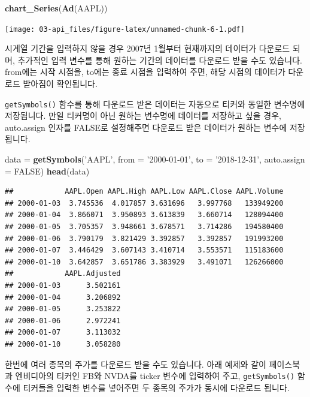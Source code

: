 \documentclass[]{book}
\newenvironment{Shaded}{\begin{snugshade}}{\end{snugshade}}
\newcommand{\DataTypeTok}[1]{\textcolor[rgb]{0.13,0.29,0.53}{#1}}
\newcommand{\KeywordTok}[1]{\textcolor[rgb]{0.13,0.29,0.53}{\textbf{#1}}}
\newcommand{\NormalTok}[1]{#1}
\newcommand{\OtherTok}[1]{\textcolor[rgb]{0.56,0.35,0.01}{#1}}
\newcommand{\StringTok}[1]{\textcolor[rgb]{0.31,0.60,0.02}{#1}}
\begin{document}
\begin{Shaded}
\begin{Highlighting}[]
\KeywordTok{chart_Series}\NormalTok{(}\KeywordTok{Ad}\NormalTok{(AAPL))}
\end{Highlighting}
\end{Shaded}

\texttt{[image: 03-api\_files/figure-latex/unnamed-chunk-6-1.pdf]}

시계열 기간을 입력하지 않을 경우 2007년 1월부터 현재까지의 데이터가 다운로드 되며, 추가적인 입력 변수를 통해 원하는 기간의 데이터를 다운로드 받을 수도 있습니다. from에는 시작 시점을, to에는 종료 시점을 입력하여 주면, 해당 시점의 데이터가 다운로드 받아짐이 확인됩니다.

\texttt{getSymbols()} 함수를 통해 다운로드 받은 데이터는 자동으로 티커와 동일한 변수명에 저장됩니다. 만일 티커명이 아닌 원하는 변수명에 데이터를 저장하고 싶을 경우, auto.assign 인자를 FALSE로 설정해주면 다운로드 받은 데이터가 원하는 변수에 저장됩니다.

\begin{Shaded}
\begin{Highlighting}[]
\NormalTok{data =}\StringTok{ }\KeywordTok{getSymbols}\NormalTok{(}\StringTok{'AAPL'}\NormalTok{, }\DataTypeTok{from =} \StringTok{'2000-01-01'}\NormalTok{, }\DataTypeTok{to =} \StringTok{'2018-12-31'}\NormalTok{, }\DataTypeTok{auto.assign =} \OtherTok{FALSE}\NormalTok{)}
\KeywordTok{head}\NormalTok{(data)}
\end{Highlighting}
\end{Shaded}

\begin{verbatim}
##            AAPL.Open AAPL.High AAPL.Low AAPL.Close AAPL.Volume
## 2000-01-03  3.745536  4.017857 3.631696   3.997768   133949200
## 2000-01-04  3.866071  3.950893 3.613839   3.660714   128094400
## 2000-01-05  3.705357  3.948661 3.678571   3.714286   194580400
## 2000-01-06  3.790179  3.821429 3.392857   3.392857   191993200
## 2000-01-07  3.446429  3.607143 3.410714   3.553571   115183600
## 2000-01-10  3.642857  3.651786 3.383929   3.491071   126266000
##            AAPL.Adjusted
## 2000-01-03      3.502161
## 2000-01-04      3.206892
## 2000-01-05      3.253822
## 2000-01-06      2.972241
## 2000-01-07      3.113032
## 2000-01-10      3.058280
\end{verbatim}

한번에 여러 종목의 주가를 다운로드 받을 수도 있습니다. 아래 예제와 같이 페이스북과 엔비디아의 티커인 FB와 NVDA를 ticker 변수에 입력하여 주고, \texttt{getSymbols()} 함수에 티커들을 입력한 변수를 넣어주면 두 종목의 주가가 동시에 다운로드 됩니다.
\end{document}
